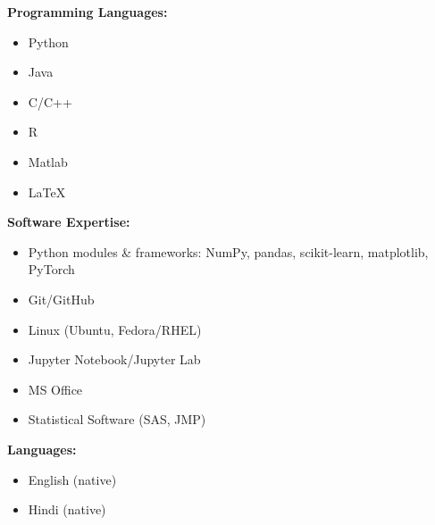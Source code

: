 \documentclass{article}
\begin{document}
		\noindent \textbf{Programming Languages:}
		\vspace{-0.8em}
		\begin{multicols}{2}
				\begin{itemize}[noitemsep, nolistsep]
						\item Python 
						\item Java 
						\item C/C++
						\item R 
						\item Matlab 
						\item \LaTeX 
				\end{itemize}
		\end{multicols}

		\noindent \textbf{Software Expertise:}
		\begin{itemize}[nolistsep]
				\item Python modules \& frameworks: NumPy, pandas, scikit-learn, matplotlib, PyTorch
		\end{itemize}
		\vspace{-1.0em}
		\begin{multicols}{2}
				\begin{itemize}[noitemsep, nolistsep]
						\item Git/GitHub 
						\item Linux (Ubuntu, Fedora/RHEL) 
						\item Jupyter Notebook/Jupyter Lab 
						\item MS Office 
						\item Statistical Software (SAS, JMP)
				\end{itemize}
		\end{multicols}

		\noindent \textbf{Languages:}
		\begin{itemize}[noitemsep, nolistsep]
				\item English (native)
				\item Hindi (native)
		\end{itemize}
\end{document}

